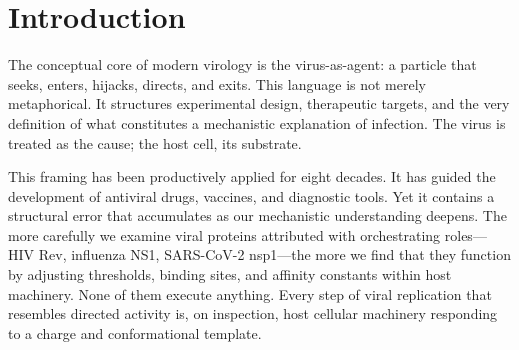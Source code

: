 \documentclass[12pt,a4paper]{article}
\theoremstyle{definition}
\theoremstyle{remark}
\begin{document}
\begin{abstract}
From these three frameworks we derive, without additional assumptions, the following: (i) viral nucleic acids must present charge-oscillation profiles matching the host's constitutively expressed housekeeping genes, because those are the templates the host machinery is calibrated to process; (ii) viral proteins are categorical boundary conditions that shift partition thresholds in host infrastructure, not orchestrators; (iii) infection probability is the overlap integral between the viral charge template and the host cell's current oscillatory exploration trajectory; (iv) viral genome size scales with host cell volume through an inversion of the cellular C-value conservation law; and (v) the observed failure of bacteriophages to infect human cells at shared mucosal surfaces reflects zero overlap between bacterial and human categorical spaces, not receptor specificity alone. Each claim generates specific, testable predictions. The framework implies that antiviral strategy should target host categorical state rather than viral machinery.
\end{abstract}

\newpage
\tableofcontents
\newpage

\section{Introduction}
\label{sec:introduction}

The conceptual core of modern virology is the virus-as-agent: a particle that seeks, enters, hijacks, directs, and exits. This language is not merely metaphorical. It structures experimental design, therapeutic targets, and the very definition of what constitutes a mechanistic explanation of infection. The virus is treated as the cause; the host cell, its substrate.

This framing has been productively applied for eight decades. It has guided the development of antiviral drugs, vaccines, and diagnostic tools. Yet it contains a structural error that accumulates as our mechanistic understanding deepens. The more carefully we examine viral proteins attributed with orchestrating roles---HIV Rev, influenza NS1, SARS-CoV-2 nsp1---the more we find that they function by adjusting thresholds, binding sites, and affinity constants within host machinery. None of them execute anything. Every step of viral replication that resembles directed activity is, on inspection, host cellular machinery responding to a charge and conformational template.
\end{document}

